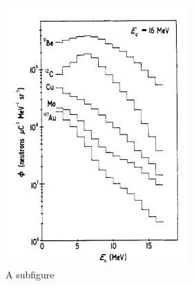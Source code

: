 \documentclass[twoside,english]{uiofysmaster/uiofysmaster}
\begin{document}
\begin{figure} [h!]
	\centering
	\begin{subfigure}{.5\textwidth}
  		\centering
  		\includegraphics[width=.9\linewidth]{meulders_16.png}
  		\caption{A subfigure}
  		\label{fig:energy_16}
	\end{subfigure}%
  \begin{subfigure}{.5\textwidth}
    \centering

\end{subfigure}
\end{figure}
\end{document}
